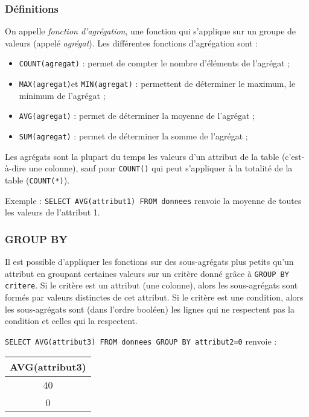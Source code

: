 \subsubsection{Définitions}
On appelle \textit{fonction d'agrégation}, une fonction qui s'applique sur un groupe de valeurs (appelé \textit{agrégat}). Les différentes fonctions d'agrégation sont :
\begin{itemize}
  \item \verb|COUNT(agregat)| : permet de compter le nombre d'éléments de l'agrégat ;
  \item \verb|MAX(agregat)|et \verb|MIN(agregat)| : permettent de déterminer le maximum, le minimum de l'agrégat ;
  \item \verb|AVG(agregat)| : permet de déterminer la moyenne de l'agrégat ;
  \item \verb|SUM(agregat)| : permet de déterminer la somme de l'agrégat ;
\end{itemize}

Les agrégats sont la plupart du temps les valeurs d'un attribut de la table (c'est-à-dire une colonne), sauf pour \verb|COUNT()| qui peut s'appliquer à la totalité de la table (\verb|COUNT(*)|).
 
Exemple : \verb|SELECT AVG(attribut1) FROM donnees| renvoie la moyenne de toutes les valeurs de l'attribut 1.
 
 \subsubsection{GROUP BY}
 
Il est possible d'appliquer les fonctions sur des sous-agrégats plus petits qu'un attribut en groupant certaines valeurs sur un critère donné grâce à \verb|GROUP BY critere|. Si le critère est un attribut (une colonne), alors les sous-agrégats sont formés par valeurs distinctes de cet attribut. Si le critère est une condition, alors les sous-agrégats sont (dans l'ordre booléen) les lignes qui ne respectent pas la condition et celles qui la respectent.

\verb|SELECT AVG(attribut3) FROM donnees GROUP BY attribut2=0| renvoie : 

\begin{center}
\begin{tabular}{|c|}\hline
AVG(attribut3)\\\hline
40 \\\hline
0 \\\hline
\end{tabular}
\end{center}

